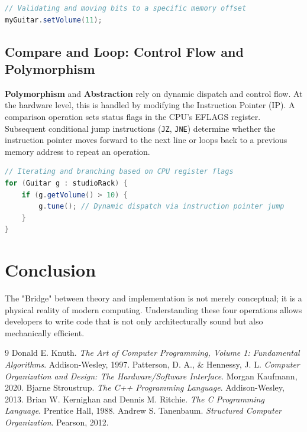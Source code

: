 \documentclass[12pt]{article}
\begin{document}
\begin{lstlisting}[language=Java, caption=Gated Bitwise Assignment]
// Validating and moving bits to a specific memory offset
myGuitar.setVolume(11); 
\end{lstlisting}

\subsection{Compare and Loop: Control Flow and Polymorphism}
\textbf{Polymorphism} and \textbf{Abstraction} rely on dynamic dispatch and control flow. At the hardware level, this is handled by modifying the Instruction Pointer (IP). A comparison operation sets status flags in the CPU's EFLAGS register. Subsequent conditional jump instructions (\texttt{JZ}, \texttt{JNE}) determine whether the instruction pointer moves forward to the next line or loops back to a previous memory address to repeat an operation.

\begin{lstlisting}[language=Java, caption=Instruction Pointer Manipulation]
// Iterating and branching based on CPU register flags
for (Guitar g : studioRack) {
    if (g.getVolume() > 10) {
        g.tune(); // Dynamic dispatch via instruction pointer jump
    }
}
\end{lstlisting}

\section{Conclusion}
The "Bridge" between theory and implementation is not merely conceptual; it is a physical reality of modern computing. Understanding these four operations allows developers to write code that is not only architecturally sound but also mechanically efficient.

\begin{thebibliography}{9}
Donald E. Knuth. \textit{The Art of Computer Programming, Volume 1: Fundamental Algorithms}. Addison-Wesley, 1997.
Patterson, D. A., \& Hennessy, J. L. \textit{Computer Organization and Design: The Hardware/Software Interface}. Morgan Kaufmann, 2020.
Bjarne Stroustrup. \textit{The C++ Programming Language}. Addison-Wesley, 2013.
Brian W. Kernighan and Dennis M. Ritchie. \textit{The C Programming Language}. Prentice Hall, 1988.
Andrew S. Tanenbaum. \textit{Structured Computer Organization}. Pearson, 2012.
\end{thebibliography}
\end{document}
